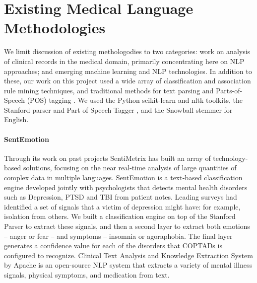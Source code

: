 \section{Existing Medical Language Methodologies}

We limit discussion of existing methologodies to two categories:
work on analysis of clinical records in the medical domain, primarily concentrating
here on NLP approaches; and emerging machine learning and NLP technologies.
In addition to these, our work on this project used a wide array of 
classification \cite{wu08} and association rule mining \cite{fpgrowth} techniques, and
traditional methods for text parsing and Parts-of-Speech (POS) tagging \cite{stanfordparser}. 
We used the Python \textsf{scikit-learn} \cite{scikit-learn} 
and \textsf{nltk} \cite{nltk} toolkits, the Stanford parser and Part of Speech Tagger \cite{stanfordparser}, and 
the Snowball stemmer for English\cite{snowball}. 

\paragraph{SentEmotion} 
Through its work on past projects \cite{dickerson14,kagan15,darpa} SentiMetrix has built an array of technology-based solutions, focusing on the near real-time analysis of large quantities of complex data in multiple languages. SentEmotion \cite{coptads,coptads-book} is a text-based classification engine developed jointly with psychologists that detects mental health disorders such as Depression, PTSD and TBI from patient notes. Leading surveys had identified a set of signals that a victim of depression might have: for example, isolation from others. We built a classification engine on top of the Stanford Parser \cite{stanfordparser} to extract these signals, and then a second layer to extract both emotions -- anger or fear -- and symptoms -- insomnia or agoraphobia. The final layer generates a confidence value for each of the disorders that COPTADs is configured to recognize. Clinical Text Analysis and Knowledge Extraction System \cite{ctakes} by Apache is an open-source NLP system that extracts a variety of mental illness signals, physical symptoms, and medication from text.

